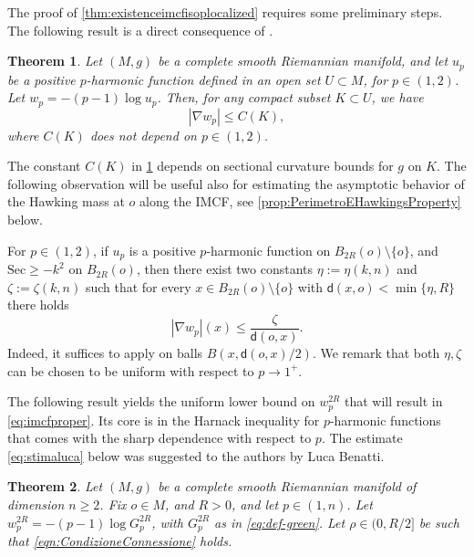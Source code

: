 \documentclass[a4paper,12pt,reqno]{amsart}
\numberwithin{equation}{section}
\theoremstyle{plain}
\newtheorem{theorem}{Theorem}[section]
\theoremstyle{definition}
\theoremstyle{remark}
\newcommand{\abs}[1]{\left\lvert#1\right\rvert}
\newcommand{\dist}{\mathsf{d}}
\begin{document}
{The proof of \cref{thm:existenceimcfisoplocalized} requires some preliminary steps. The following result is a direct consequence of \cite[Theorem 1.1]{kotschwar_localgradientestimatesharmonic_2009}.

\begin{theorem}\label{thm:boundkotni}
    Let $(M, g)$ be a complete smooth Riemannian manifold, and let $u_p$ be a positive $p$-harmonic function defined in an open set $U \subset M$, for $p \in (1, 2)$. Let $w_p = -(p-1) \log u_p$. Then, for any compact subset $K \subset U$, we have
    \begin{equation}
\label{eq:boundkotni}
        \abs{\nabla w_p} \leq C(K),
    \end{equation}
    where $C(K)$ does not depend on $p \in (1, 2)$.
\end{theorem}
The constant $C(K)$ in \cref{thm:boundkotni} depends on sectional curvature bounds for $g$ on $K$.
The following observation will be useful also for estimating the asymptotic behavior of the Hawking mass at $o$ along the IMCF, see \cref{prop:PerimetroEHawkingsProperty} below.

\begin{remark}
For $p\in (1,2)$, if $u_p$ is a positive $p$-harmonic function on $B_{2R}(o)\setminus\{o\}$, and $\mathrm{Sec}\geq -k^2$ on $B_{2R}(o)$, then there exist two constants $\eta:=\eta(k,n)$ and $\zeta:=\zeta(k,n)$ such that for every $x\in B_{2R}(o)\setminus\{o\}$ with $\dist(x,o)<\min\{\eta,R\}$ there holds
    \begin{equation}\label{eqn:SharpGradientKotNi}
    |\nabla w_p|(x) \leq \frac{\zeta}{\dist(o,x)}. 
    \end{equation}
    Indeed, it suffices to apply \cite[Equation (1.5)]{kotschwar_localgradientestimatesharmonic_2009} on balls $B(x,\dist(o,x)/2)$. We remark that both $\eta,\zeta$ can be chosen to be uniform with respect to $p\to 1^+$.
\end{remark}


The following result yields the uniform lower bound on $w_p^{2R}$ that will result in \eqref{eq:imcfproper}.
Its core is in the Harnack inequality for $p$-harmonic functions that comes with the sharp dependence with respect to $p$. The estimate \eqref{eq:stimaluca} below was suggested to the authors by Luca Benatti.



\begin{theorem}\label{thm:EstimatepHarmonic}
Let $(M,g)$ be a complete smooth Riemannian manifold of dimension $n\ge 2$. Fix $o\in M$, and $R>0$, and let $p \in (1,n)$. Let $w_p^{2R} = -(p-1) \log G_p^{2R}$, with $G_p^{2R}$ as in \eqref{eq:def-green}. Let $\rho \in (0,R/2]$ be such that \eqref{eqn:CondizioneConnessione} holds.
    

\end{theorem}}
\end{document}
